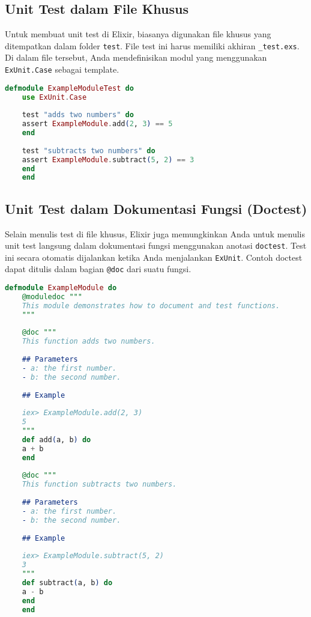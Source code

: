 \subsection{Unit Test dalam File Khusus}

Untuk membuat unit test di Elixir, biasanya digunakan file khusus yang ditempatkan dalam folder \texttt{test}. File test ini harus memiliki akhiran \texttt{\_test.exs}. Di dalam file tersebut, Anda mendefinisikan modul yang menggunakan \texttt{ExUnit.Case} sebagai template.

\begin{lstlisting}[language=Elixir]
	defmodule ExampleModuleTest do
	use ExUnit.Case
	
	test "adds two numbers" do
	assert ExampleModule.add(2, 3) == 5
	end
	
	test "subtracts two numbers" do
	assert ExampleModule.subtract(5, 2) == 3
	end
	end
\end{lstlisting}

\subsection{Unit Test dalam Dokumentasi Fungsi (Doctest)}

Selain menulis test di file khusus, Elixir juga memungkinkan Anda untuk menulis unit test langsung dalam dokumentasi fungsi menggunakan anotasi \texttt{doctest}. Test ini secara otomatis dijalankan ketika Anda menjalankan \texttt{ExUnit}. Contoh doctest dapat ditulis dalam bagian \texttt{@doc} dari suatu fungsi.

\begin{lstlisting}[language=Elixir]
	defmodule ExampleModule do
	@moduledoc """
	This module demonstrates how to document and test functions.
	"""
	
	@doc """
	This function adds two numbers.
	
	## Parameters
	- a: the first number.
	- b: the second number.
	
	## Example
	
	iex> ExampleModule.add(2, 3)
	5
	"""
	def add(a, b) do
	a + b
	end
	
	@doc """
	This function subtracts two numbers.
	
	## Parameters
	- a: the first number.
	- b: the second number.
	
	## Example
	
	iex> ExampleModule.subtract(5, 2)
	3
	"""
	def subtract(a, b) do
	a - b
	end
	end
\end{lstlisting}

